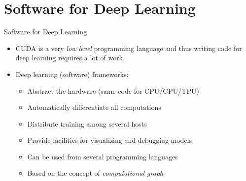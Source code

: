 \section{Software for Deep Learning}
\begin{frame} {Software for Deep Learning}
  \begin{itemize}
    \item CUDA is a very \textit{low level} programming language and thus writing code for deep learning requires a lot of work.
    \item Deep learning (software) frameworks:
    \begin{itemize}
      \item Abstract the hardware (same code for CPU/GPU/TPU)
      \item Automatically differentiate all computations
      \item Distribute training among several hosts
      \item Provide facilities for visualizing and debugging models
      \item Can be used from several programming languages
      \item Based on the concept of \emph{computational graph}
    \end{itemize}
  \end{itemize}
  \begin{figure}
    \centering
  \end{figure}
\end{frame}


